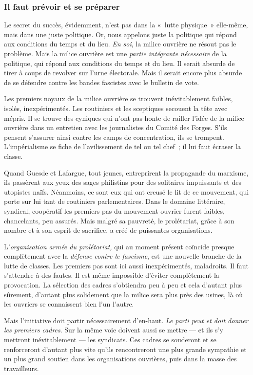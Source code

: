 \documentclass[french,twoside]{book} %
\begin{document}
 \subsubsection[{Il faut prévoir et se préparer}]{Il faut prévoir et se préparer}
\noindent Le secret du succès, évidemment, n’est pas dans la « lutte physique » elle-même, mais dans une juste politique. Or, nous appelons juste la politique qui répond aux conditions du temps et du lieu. \emph{En soi}, la milice ouvrière ne résout pas le problème. Mais la milice ouvrière est une \emph{partie intégrante nécessaire} de la politique, qui répond aux conditions du temps et du lieu. Il serait absurde de tirer à coups de revolver sur l’urne électorale. Mais il serait encore plus absurde de se défendre contre les bandes fascistes avec le bulletin de vote.\par
Les premiers noyaux de la milice ouvrière se trouvent inévitablement faibles, isolés, inexpérimentés. Les routiniers et les sceptiques secouent la tête avec mépris. Il se trouve des cyniques qui n’ont pas honte de railler l’idée de la milice ouvrière dans un entretien avec les journalistes du Comité des Forges. S’ils pensent s’assurer ainsi contre les camps de concentration, ils se trompent. L’impérialisme se fiche de l’avilissement de tel ou tel chef ; il lui faut écraser la classe.\par
Quand Guesde et Lafargue, tout jeunes, entreprirent la propagande du marxisme, ils passèrent aux yeux des sages philistins pour des solitaires impuissants et des utopistes naïfs. Néanmoins, ce sont eux qui ont creusé le lit de ce mouvement, qui porte sur lui tant de routiniers parlementaires. Dans le domaine littéraire, syndical, coopératif les premiers pas du mouvement ouvrier furent faibles, chancelants, peu assurés. Mais malgré sa pauvreté, le prolétariat, grâce à son nombre et à son esprit de sacrifice, a créé de puissantes organisations.\par
L’\emph{organisation armée du prolétariat,} qui au moment présent coïncide presque complètement avec la \emph{défense contre le fascisme}, est une nouvelle branche de la lutte de classes. Les premiers pas sont ici aussi inexpérimentés,  maladroits. Il faut s’attendre à des fautes. Il est même impossible d’éviter complètement la provocation. La sélection des cadres s’obtiendra peu à peu et cela d’autant plus sûrement, d’autant plus solidement que la milice sera plus près des usines, là où les ouvriers se connaissent bien l’un l’autre.\par
Mais l’initiative doit partir nécessairement d’en-haut. \emph{Le parti peut et doit donner les premiers cadres}. Sur la même voie doivent aussi se mettre — et ils s’y mettront inévitablement — les syndicats. Ces cadres se souderont et se renforceront d’autant plus vite qu’ils rencontreront une plus grande sympathie et un plus grand soutien dans les organisations ouvrières, puis dans la masse des travailleurs.\par
\end{document}
